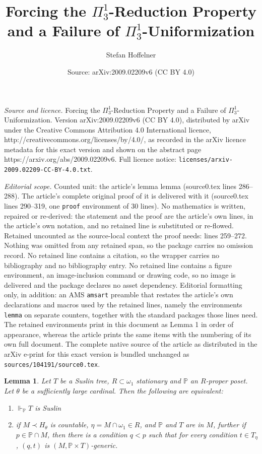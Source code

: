 \documentclass[10pt,a4paper]{amsart}
\title{Forcing the ${\Pi^1_3}$-Reduction Property and a Failure of $\Pi^1_3$-Uniformization}
\author{Stefan Hoffelner}
\date{Source: arXiv:2009.02209v6 (CC BY 4.0)}
\newtheorem{lemma}{Lemma}
\newcommand{\forceP}{\mathbb{P}}
\begin{document}
\maketitle

\noindent\emph{Source and licence.} Forcing the ${\Pi^1_3}$-Reduction Property and a Failure of $\Pi^1_3$-Uniformization. Version arXiv:2009.02209v6 (CC BY 4.0), distributed by arXiv under the Creative Commons Attribution 4.0 International licence, http://creativecommons.org/licenses/by/4.0/, as recorded in the arXiv licence metadata for this exact version and shown on the abstract page https://arxiv.org/abs/2009.02209v6. Full licence notice: \texttt{licenses/arxiv-2009.02209-CC-BY-4.0.txt}.\par\smallskip

\noindent\textit{Editorial scope.} Counted unit: the article's lemma lemma (source0.tex lines 286--288). The article's complete original proof of it is delivered with it (source0.tex lines 290--319, one \texttt{proof} environment of 30 lines). No mathematics is written, repaired or re-derived: the statement and the proof are the article's own lines, in the article's own notation, and no retained line is substituted or re-flowed.  Retained uncounted as the source-local context the proof needs: lines 259--272.  Nothing was omitted from any retained span, so the package carries no omission record.  No retained line contains a citation, so the wrapper carries no bibliography and no bibliography entry.  No retained line contains a figure environment, an image-inclusion command or drawing code, so no image is delivered and the package declares no asset dependency.  Editorial formatting only, in addition: an AMS \texttt{amsart} preamble that restates the article's own declarations and macros used by the retained lines, namely the environments \texttt{lemma} on separate counters, together with the standard packages those lines need.  The retained environments print in this document as Lemma 1 in order of appearance, whereas the article prints the same items with the numbering of its own full document.  The complete native source of the article as distributed in the arXiv e-print for this exact version is bundled unchanged as \texttt{sources/104191/source0.tex}.
\begin{lemma}\label{preservation of Suslin trees}
 Let $T$ be a Suslin tree, $R \subset \omega_1$ stationary and $\forceP$ an $R$-proper
 poset. Let $\theta$ be a sufficiently large cardinal.
 Then the following are equivalent:
 \begin{enumerate}
  \item $\Vdash_{\forceP} T$ is Suslin
 
  \item if $M \prec H_{\theta}$ is countable, $\eta = M \cap \omega_1 \in R$, and $\forceP$ and $T$ are in $M$,
  further if $p \in \forceP \cap M$, then there is a condition $q<p$ such that 
  for every condition $t \in T_{\eta}$, 
  $(q,t)$ is $(M, \forceP \times T)$-generic.
 \end{enumerate}

\end{lemma}
\end{document}
